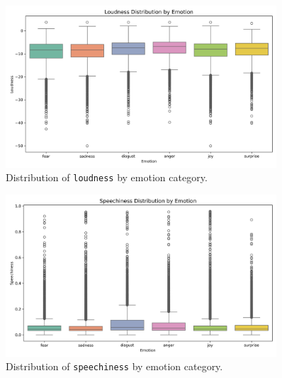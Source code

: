 \documentclass{article}
\begin{document}
\begin{figure}[H]
\centering
\includegraphics[width=0.9\textwidth]{Graphics/feature_by_emotion/loudness_by_emotion_boxplot.png}
\caption{Distribution of \texttt{loudness} by emotion category.}
\end{figure}

\begin{figure}[H]
\centering
\includegraphics[width=0.9\textwidth]{Graphics/feature_by_emotion/speechiness_by_emotion_boxplot.png}
\caption{Distribution of \texttt{speechiness} by emotion category.}
\end{figure}
\end{document}
